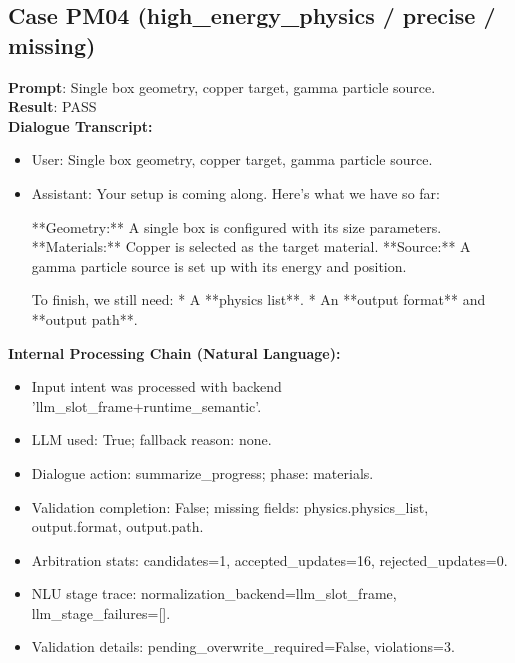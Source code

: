 \documentclass[11pt]{ctexart}
\begin{document}
\subsection{Case PM04 (high\_energy\_physics / precise / missing)}
\textbf{Prompt}: Single box geometry, copper target, gamma particle source.\\
\textbf{Result}: PASS\\
\textbf{Dialogue Transcript:}
\begin{itemize}
\item User: Single box geometry, copper target, gamma particle source.
\item Assistant: Your setup is coming along. Here's what we have so far:

**Geometry:** A single box is configured with its size parameters.
**Materials:** Copper is selected as the target material.
**Source:** A gamma particle source is set up with its energy and position.

To finish, we still need:
*   A **physics list**.
*   An **output format** and **output path**.
\end{itemize}
\textbf{Internal Processing Chain (Natural Language):}
\begin{itemize}
\item Input intent was processed with backend 'llm\_slot\_frame+runtime\_semantic'.
\item LLM used: True; fallback reason: none.
\item Dialogue action: summarize\_progress; phase: materials.
\item Validation completion: False; missing fields: physics.physics\_list, output.format, output.path.
\item Arbitration stats: candidates=1, accepted\_updates=16, rejected\_updates=0.
\item NLU stage trace: normalization\_backend=llm\_slot\_frame, llm\_stage\_failures=[].
\item Validation details: pending\_overwrite\_required=False, violations=3.
\end{itemize}
\end{document}
